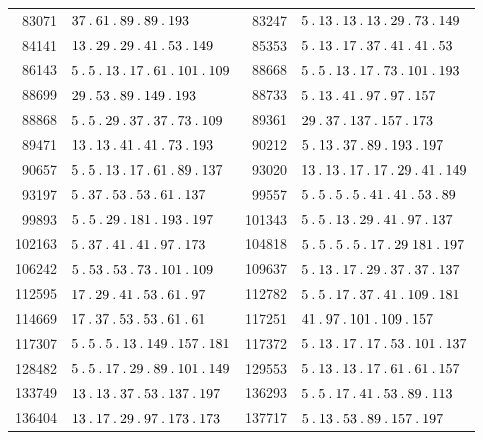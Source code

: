 \begin{longtable}{@{}r|l@{\qquad}r|l@{}}
83071 & $37\pdot 61\pdot 89\pdot 89\pdot 193$ & 83247 & $5\pdot 13\pdot 13\pdot 13\pdot 29\pdot 73\pdot 149$\\
84141 & $13\pdot 29\pdot 29\pdot 41\pdot 53\pdot 149$ & 85353 & $5\pdot 13\pdot 17\pdot 37\pdot 41\pdot 41\pdot 53$\\
86143 & $5\pdot 5\pdot 13\pdot 17\pdot 61\pdot 101\pdot 109$ & 88668 & $5\pdot 5\pdot 13\pdot 17\pdot 73\pdot 101\pdot 193$\\
88699 & $29\pdot 53\pdot 89\pdot 149\pdot 193$ & 88733 & $5\pdot 13\pdot 41\pdot 97\pdot 97\pdot 157$\\
88868 & $5\pdot 5\pdot 29\pdot 37\pdot 37\pdot 73\pdot 109$ & 89361 & $29\pdot 37\pdot 137\pdot 157\pdot 173$\\
89471 & $13\pdot 13\pdot 41\pdot 41\pdot 73\pdot 193$ & 90212 & $5\pdot 13\pdot 37\pdot 89\pdot 193\pdot 197$\\
90657 & $5\pdot 5\pdot 13\pdot 17\pdot 61\pdot 89\pdot 137$ & 93020 & $13\pdot 13\pdot 17\pdot 17\pdot 29\pdot 41\pdot 149$\\
93197 & $5\pdot 37\pdot 53\pdot 53\pdot 61\pdot 137$ & 99557 & $5\pdot 5\pdot 5\pdot 5\pdot 41\pdot 41\pdot 53\pdot 89$\\
99893 & $5\pdot 5\pdot 29\pdot 181\pdot 193\pdot 197$ & 101343 & $5\pdot 5\pdot 13\pdot 29\pdot 41\pdot 97\pdot 137$\\
102163 & $5\pdot 37\pdot 41\pdot 41\pdot 97\pdot 173$ & 104818 & $5\pdot 5\pdot 5\pdot 5\pdot 17\pdot 29\;181\pdot 197$\\
106242 & $5\pdot 53\pdot 53\pdot 73\pdot 101\pdot 109$ & 109637 & $5\pdot 13\pdot 17\pdot 29\pdot 37\pdot 37\pdot 137$\\
112595 & $17\pdot 29\pdot 41\pdot 53\pdot 61\pdot 97$ & 112782 & $5\pdot 5\pdot 17\pdot 37\pdot 41\pdot 109\pdot 181$\\
114669 & $17\pdot 37\pdot 53\pdot 53\pdot 61\pdot 61$ & 117251 & $41\pdot 97\pdot 101\pdot 109\pdot 157$\\
117307 & $5\pdot 5\pdot 5\pdot 13\pdot 149\pdot 157\pdot 181$ & 117372 & $5\pdot 13\pdot 17\pdot 17\pdot 53\pdot 101\pdot 137$\\
128482 & $5\pdot 5\pdot 17\pdot 29\pdot 89\pdot 101\pdot 149$ & 129553 & $5\pdot 13\pdot 13\pdot 17\pdot 61\pdot 61\pdot 157$\\
133749 & $13\pdot 13\pdot 37\pdot 53\pdot 137\pdot 197$ & 136293 & $5\pdot 5\pdot 17\pdot 41\pdot 53\pdot 89\pdot 113$\\
136404 & $13\pdot 17\pdot 29\pdot 97\pdot 173\pdot 173$ & 137717 & $5\pdot 13\pdot 53\pdot 89\pdot 157\pdot 197$\\

\end{longtable}
